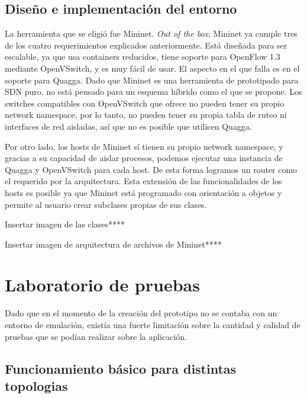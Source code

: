 \documentclass[a4paper,12pt]{report}
\begin{document}
\subsection{Diseño e implementación del entorno}
La herramienta que se eligió fue Mininet. \textit{Out of the box}, Mininet ya cumple tres de los cuatro requerimientos explicados anteriormente. Está diseñada para ser escalable, ya que usa containers reducidos, tiene soporte para OpenFlow 1.3 mediante OpenVSwitch, y es muy fácil de usar. El aspecto en el que falla es en el soporte para Quagga. Dado que Mininet es una herramienta de prototipado para SDN puro, no está pensado para un esquema híbrido como el que se propone. Los switches compatibles con OpenVSwitch que ofrece no pueden tener su propio network namespace, por lo tanto, no pueden tener su propia tabla de ruteo ni interfaces de red aisladas, así que no es posible que utilicen Quagga.

Por otro lado, los hosts de Mininet sí tienen su propio network namespace, y gracias a su capacidad de aislar procesos, podemos ejecutar una instancia de Quagga y OpenVSwitch para cada host. De esta forma logramos un router como el requerido por la arquitectura. Esta extensión de las funcionalidades de los hosts es posible ya que Mininet está programado con orientación a objetos y permite al usuario crear subclases propias de sus clases.

Insertar imagen de las clases****

Insertar imagen de arquitectura de archivos de Mininet****



\section{Laboratorio de pruebas}
Dado que en el momento de la creación del prototipo no se contaba con un entorno de emulación, existía una fuerte limitación sobre la cantidad y calidad de pruebas que se podían realizar sobre la aplicación.

\subsection{Funcionamiento básico para distintas topologias}
\end{document}
